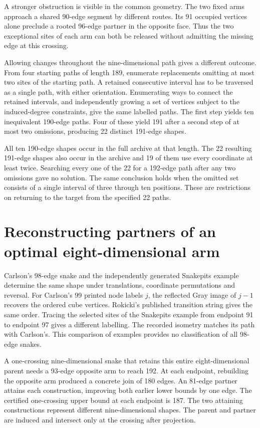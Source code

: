 \documentclass[11pt,a4paper]{article}
\theoremstyle{definition}
\theoremstyle{remark}
\begin{document}
A stronger obstruction is visible in the common geometry. The two fixed arms approach a shared 90-edge segment by different routes. Its 91 occupied vertices alone preclude a rooted 96-edge partner in the opposite face. Thus the two exceptional sites of each arm can both be released without admitting the missing edge at this crossing.

Allowing changes throughout the nine-dimensional path gives a different outcome. From four starting paths of length 189, enumerate replacements omitting at most two sites of the starting path. A retained consecutive interval has to be traversed as a single path, with either orientation. Enumerating ways to connect the retained intervals, and independently growing a set of vertices subject to the induced-degree constraints, give the same labelled paths. The first step yields ten inequivalent 190-edge paths. Four of these yield 191 after a second step of at most two omissions, producing 22 distinct 191-edge shapes.

All ten 190-edge shapes occur in the full archive at that length. The 22 resulting 191-edge shapes also occur in the archive and 19 of them use every coordinate at least twice. Searching every one of the 22 for a 192-edge path after any two omissions gave no solution. The same conclusion holds when the omitted set consists of a single interval of three through ten positions. These are restrictions on returning to the target from the specified 22 paths.

\section{Reconstructing partners of an optimal eight-dimensional arm}
Carlson's 98-edge snake and the independently generated Snakepits example determine the same shape under translations, coordinate permutations and reversal. For Carlson's 99 printed node labels \(j\), the reflected Gray image of \(j-1\) recovers the ordered cube vertices. Rokicki's published transition string gives the same order. Tracing the selected sites of the Snakepits example from endpoint 91 to endpoint 97 gives a different labelling. The recorded isometry matches its path with Carlson's. This comparison of examples provides no classification of all 98-edge snakes.

A one-crossing nine-dimensional snake that retains this entire eight-dimensional parent needs a 93-edge opposite arm to reach 192. At each endpoint, rebuilding the opposite arm produced a concrete join of 180 edges. An 81-edge partner attains each construction, improving both earlier lower bounds by one edge. The certified one-crossing upper bound at each endpoint is 187. The two attaining constructions represent different nine-dimensional shapes. The parent and partner are induced and intersect only at the crossing after projection.
\end{document}
